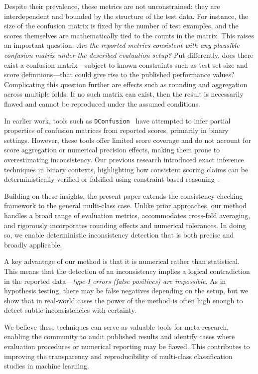 \documentclass[3p, times]{elsarticle}
\begin{document}
Despite their prevalence, these metrics are not unconstrained: they are interdependent and bounded by the structure of the test data. For instance, the size of the confusion matrix is fixed by the number of test examples, and the scores themselves are mathematically tied to the counts in the matrix. This raises an important question: 
\emph{Are the reported metrics consistent with any plausible confusion matrix under the described evaluation setup?} 
Put differently, does there exist a confusion matrix---subject to known constraints such as test set size and score definitions---that could give rise to the published performance values? Complicating this question further are effects such as rounding and aggregation across multiple folds. If no such matrix can exist, then the result is necessarily flawed and cannot be reproduced under the assumed conditions.

In earlier work, tools such as \texttt{DConfusion}~\cite{dconfusion} have attempted to infer partial properties of confusion matrices from reported scores, primarily in binary settings. However, these tools offer limited score coverage and do not account for score aggregation or numerical precision effects, making them prone to overestimating inconsistency. Our previous research introduced exact inference techniques in binary contexts, highlighting how consistent scoring claims can be deterministically verified or falsified using constraint-based reasoning~\cite{vesselsegm, vessel}.

Building on these insights, the present paper extends the consistency checking framework to the general multi-class case. Unlike prior approaches, our method handles a broad range of evaluation metrics, accommodates cross-fold averaging, and rigorously incorporates rounding effects and numerical tolerances. In doing so, we enable deterministic inconsistency detection that is both precise and broadly applicable.

A key advantage of our method is that it is numerical rather than statistical. This means that the detection of an inconsistency implies a logical contradiction in the reported data---\emph{type-I errors (false positives) are impossible}. As in hypothesis testing, there may be false negatives depending on the setup, but we show that in real-world cases the power of the method is often high enough to detect subtle inconsistencies with certainty.

We believe these techniques can serve as valuable tools for meta-research, enabling the community to audit published results and identify cases where evaluation procedures or numerical reporting may be flawed. This contributes to improving the transparency and reproducibility of multi-class classification studies in machine learning.
\end{document}
